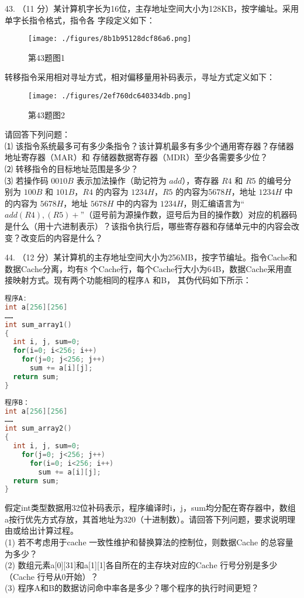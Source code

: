 43. （11 分）某计算机字长为16位，主存地址空间大小为128KB，按字编址。采用单字长指令格式，指令各
字段定义如下： \\
\begin{figure}[ht]
\centering
\texttt{[image: ./figures/8b1b95128dcf86a6.png]}
\caption{第43题图1} \label{fig_CSN10_5}
\end{figure}
转移指令采用相对寻址方式，相对偏移量用补码表示，寻址方式定义如下： \\
\begin{figure}[ht]
\centering
\texttt{[image: ./figures/2ef760dc640334db.png]}
\caption{第43题图2} \label{fig_CSN10_6}
\end{figure}

请回答下列问题： \\
⑴ 该指令系统最多可有多少条指令？该计算机最多有多少个通用寄存器？存储器地址寄存器（MAR）和
存储器数据寄存器（MDR）至少各需要多少位？ \\
⑵ 转移指令的目标地址范围是多少？ \\
⑶ 若操作码 $0010B$ 表示加法操作（助记符为 $add$），寄存器 $R4$ 和 $R5$ 的编号分别为 $100B$ 和 $101B$，$R4$ 的内容为 $1234H$，$R5$ 的内容为5$678H$，地址 $1234H$ 中的内容为 $5678H$，地址 $5678H$ 中的内容为 $1234H$，则汇编语言为“$add (R4), (R5)+$”（逗号前为源操作数，逗号后为目的操作数）对应的机器码是什么（用十六进制表示）？该指令执行后，哪些寄存器和存储单元中的内容会改变？改变后的内容是什么？

44. （12 分）某计算机的主存地址空间大小为256MB，按字节编址。指令Cache和数据Cache分离，均有8
个Cache行，每个Cache行大小为64B，数据Cache采用直接映射方式。现有两个功能相同的程序A 和B，
其伪代码如下所示： \\
\begin{lstlisting}[language=cpp]
程序A:
int a[256][256]
……
int sum_array1()
{
  int i, j, sum=0;
  for(i=0; i<256; i++)
    for(j=0; j<256; j++)
      sum += a[i][j];
  return sum;
}
\end{lstlisting}

\begin{lstlisting}[language=cpp]
程序B：
int a[256][256]
……
int sum_array2()
{
  int i, j, sum=0;
    for(j=0; j<256; j++)
      for(i=0; i<256; i++)
        sum += a[i][j];
  return sum;
}
\end{lstlisting}

假定int类型数据用32位补码表示，程序编译时i，j，sum均分配在寄存器中，数组a按行优先方式存放，其首地址为320（十进制数）。请回答下列问题，要求说明理由或给出计算过程。 \\
(1) 若不考虑用于cache 一致性维护和替换算法的控制位，则数据Cache 的总容量为多少？ \\
(2) 数组元素a[0][31]和a[1][1]各自所在的主存块对应的Cache 行号分别是多少（Cache 行号从0开始）？ \\
(3) 程序A和B的数据访问命中率各是多少？哪个程序的执行时间更短？

